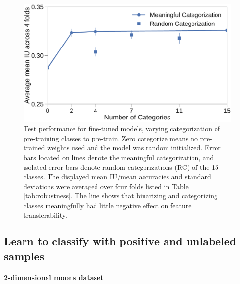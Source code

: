 \begin{figure}[t]
\centering
   \includegraphics[width=1.\linewidth]{img/num_classes.eps}
\caption{
Test performance for fine-tuned models, varying categorization of pre-training classes to pre-train.
Zero categorize means no pre-trained weights used and the model was random initialized.
Error bars located on lines denote the meaningful categorization, and isolated error bars denote random categorizations (RC) of the 15 classes.
The displayed mean IU/mean accuracies and standard deviations were averaged over four folds listed in Table \ref{tab:robustness}.
The line shows that binarizing and categorizing classes meaningfully had little negative effect on feature transferability.
}
\label{fig:categories}
\end{figure}



\subsection{Learn to classify with positive and unlabeled samples}
\label{subsec:pulearning}


\paragraph{2-dimensional moons dataset}


